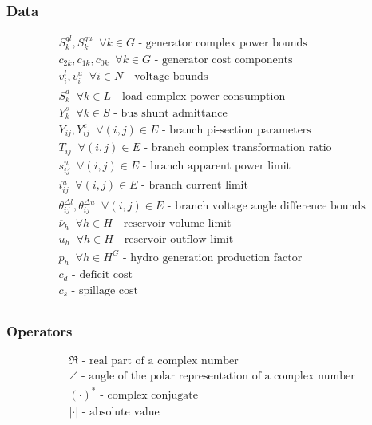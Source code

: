 \documentclass{juliacon}
\begin{document}
\subsubsection*{Data}
\begin{align*}
%
& S^{gl}_k, S^{gu}_k \;\; \forall k \in G \nonumber \mbox{ - generator complex power bounds}\\
& c_{2k}, c_{1k}, c_{0k} \;\; \forall k \in G \nonumber  \mbox{ - generator cost components}\\
& v^l_i, v^u_i \;\; \forall i \in N \nonumber \mbox{ - voltage bounds}\\
& S^d_k \;\; \forall k \in L \nonumber \mbox{ - load complex power consumption}\\
& Y^s_{k} \;\; \forall k \in S \nonumber \mbox{ - bus shunt admittance}\\
& Y_{ij}, Y^c_{ij} \;\; \forall (i,j) \in E \nonumber \mbox{ - branch pi-section parameters}\\
& {T}_{ij} \;\; \forall (i,j) \in E \nonumber \mbox{ - branch complex transformation ratio}\\
& s^u_{ij}  \;\; \forall (i,j) \in E \nonumber \mbox{ - branch apparent power limit}\\
& i^u_{ij}  \;\; \forall (i,j) \in E \nonumber \mbox{ - branch current limit}\\
& \theta^{\Delta l}_{ij}, \theta^{\Delta u}_{ij} \;\; \forall (i,j) \in E \nonumber \mbox{ - branch voltage angle difference bounds}\\
& \overline{\nu}_h  \;\; \forall h \in H \nonumber \mbox{ - reservoir volume limit}\\
& \overline{u}_h  \;\; \forall h \in H \nonumber \mbox{ - reservoir outflow limit}\\
& p_h  \;\; \forall h \in H^G \nonumber \mbox{ - hydro generation production factor}\\
& c_{d} \nonumber \mbox{ - deficit cost}\\
& c_{s} \nonumber \mbox{ - spillage cost}\\
%
\end{align*}

\subsubsection*{Operators}
\begin{align*}
%
& \Re \nonumber \mbox{ - real part of a complex number}\\
& \angle \nonumber \mbox{ - angle of the polar representation of a complex number}\\
& (\cdot)^{*} \nonumber \mbox{ - complex conjugate}\\
& |\cdot| \nonumber \mbox{ - absolute value}\\
%
\end{align*}
\end{document}
